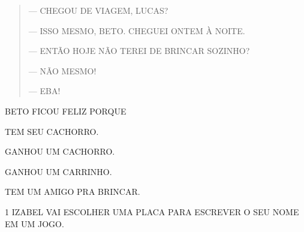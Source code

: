 \begin{quote}
— CHEGOU DE VIAGEM, LUCAS?

— ISSO MESMO, BETO. CHEGUEI ONTEM À NOITE.

— ENTÃO HOJE NÃO TEREI DE BRINCAR SOZINHO?

— NÃO MESMO!

— EBA!
\end{quote}

BETO FICOU FELIZ PORQUE

\begin{escolha}
\item TEM SEU CACHORRO.

\item GANHOU UM CACHORRO.

\item GANHOU UM CARRINHO.

\item TEM UM AMIGO PRA BRINCAR.
\end{escolha}

\blankpage



\pagebreak

\num{1} IZABEL VAI ESCOLHER UMA PLACA PARA ESCREVER O SEU NOME EM UM JOGO.

